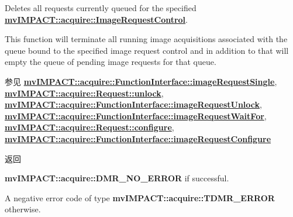 Deletes all requests currently queued for the specified {\bfseries \hyperlink{classmv_i_m_p_a_c_t_1_1acquire_1_1_image_request_control}{mv\+I\+M\+P\+A\+C\+T\+::acquire\+::\+Image\+Request\+Control}}. 

This function will terminate all running image acquisitions associated with the queue bound to the specified image request control and in addition to that will empty the queue of pending image requests for that queue. \begin{DoxySeeAlso}{参见}
{\bfseries \hyperlink{classmv_i_m_p_a_c_t_1_1acquire_1_1_function_interface_a59571120b5e81c3af596ea5da5dc63ba}{mv\+I\+M\+P\+A\+C\+T\+::acquire\+::\+Function\+Interface\+::image\+Request\+Single}}, ~\newline
{\bfseries \hyperlink{classmv_i_m_p_a_c_t_1_1acquire_1_1_request_a3c30ced407d20caef49e3148257cd91e}{mv\+I\+M\+P\+A\+C\+T\+::acquire\+::\+Request\+::unlock}}, ~\newline
{\bfseries \hyperlink{classmv_i_m_p_a_c_t_1_1acquire_1_1_function_interface_a378a338217d5a681e880a0d9395f1a62}{mv\+I\+M\+P\+A\+C\+T\+::acquire\+::\+Function\+Interface\+::image\+Request\+Unlock}}, ~\newline
{\bfseries \hyperlink{classmv_i_m_p_a_c_t_1_1acquire_1_1_function_interface_a4cefdfda8e8940736ae9a4c97b6de8c9}{mv\+I\+M\+P\+A\+C\+T\+::acquire\+::\+Function\+Interface\+::image\+Request\+Wait\+For}}, ~\newline
{\bfseries \hyperlink{classmv_i_m_p_a_c_t_1_1acquire_1_1_request_a5ad02aed16acd60699f3d8757c63af43}{mv\+I\+M\+P\+A\+C\+T\+::acquire\+::\+Request\+::configure}}, ~\newline
{\bfseries \hyperlink{classmv_i_m_p_a_c_t_1_1acquire_1_1_function_interface_a05594ac5b54679152d27ac0e73b3908e}{mv\+I\+M\+P\+A\+C\+T\+::acquire\+::\+Function\+Interface\+::image\+Request\+Configure}} 
\end{DoxySeeAlso}
\begin{DoxyReturn}{返回}

\begin{DoxyItemize}
\item {\bfseries mv\+I\+M\+P\+A\+C\+T\+::acquire\+::\+D\+M\+R\+\_\+\+N\+O\+\_\+\+E\+R\+R\+O\+R} if successful.
\item A negative error code of type {\bfseries mv\+I\+M\+P\+A\+C\+T\+::acquire\+::\+T\+D\+M\+R\+\_\+\+E\+R\+R\+O\+R} otherwise. 
\end{DoxyItemize}
\end{DoxyReturn}

